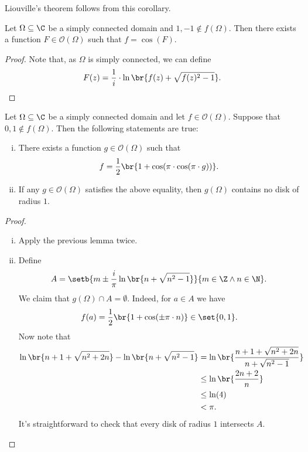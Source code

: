 \begin{opomba}
Liouville's theorem follows from this corollary.
\end{opomba}

\begin{lema}\label{thm_hol:lm:arcos}
Let $\Omega \subseteq \C$ be a simply connected domain and
$1, -1 \not \in f(\Omega)$. Then there exists a function
$F \in \mathcal{O}(\Omega)$ such that $f = \cos(F)$.
\end{lema}

\begin{proof}
Note that, as $\Omega$ is simply connected, we can define
\[
F(z) =
\frac{1}{i} \cdot \ln \br{f(z) + \sqrt{f(z)^2-1}}. \qedhere
\]
\end{proof}

\begin{izrek}
Let $\Omega \subseteq \C$ be a simply connected domain and let
$f \in \mathcal{O}(\Omega)$. Suppose that
$0, 1 \not \in f(\Omega)$. Then the following statements are true:

\begin{enumerate}[i)]
\item There exists a function $g \in \mathcal{O}(\Omega)$ such that
\[
f = \frac{1}{2} \br{1 + \cos(\pi \cdot \cos(\pi \cdot g))}.
\]
\item If any $g \in \mathcal{O}(\Omega)$ satisfies the above
equality, then $g(\Omega)$ contains no disk of radius $1$.
\end{enumerate}
\end{izrek}

\begin{proof}
\phantom{a}
\begin{enumerate}[i)]
\item Apply the previous lemma twice.
\item Define
\[
A =
\setb{m \pm \frac{i}{\pi} \ln \br{n + \sqrt{n^2-1}}}
{m \in \Z \land n \in \N}.
\]
We claim that $g(\Omega) \cap A = \emptyset$. Indeed, for $a \in A$
we have
\[
f(a) = \frac{1}{2} \br{1 + \cos(\pm \pi \cdot n)} \in \set{0,1}.
\]
Now note that
\begin{align*}
\ln \br{n+1 + \sqrt{n^2 + 2n}} - \ln \br{n + \sqrt{n^2-1}} &=
\ln \br{\frac{n+1 + \sqrt{n^2 + 2n}}{n + \sqrt{n^2 - 1}}}
\\
&\leq
\ln \br{\frac{2n + 2}{n}}
\\
&\leq \ln(4)
\\
&<
\pi.
\end{align*}
It's straightforward to check that every disk of radius $1$
intersects $A$. \qedhere
\end{enumerate}
\end{proof}

